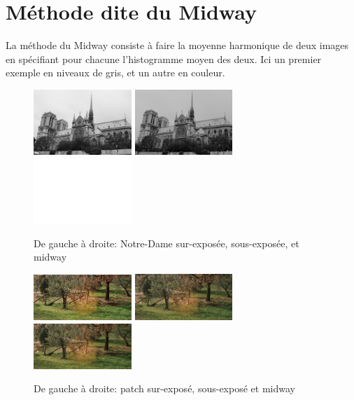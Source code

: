 \documentclass{article}
\begin{document}
\begin{figure}[h]
  \caption{}
\end{figure}


\section{Méthode dite du Midway}
La méthode du Midway consiste à faire la moyenne harmonique de deux images en spécifiant pour chacune l'histogramme moyen des deux. Ici un premier exemple en niveaux de gris, et un autre en couleur.

\begin{figure}[h]
	\includegraphics[width=0.33\textwidth]{NotreDame1.png}
	\includegraphics[width=0.33\textwidth]{NotreDame2.png}
	\includegraphics[width=0.33\textwidth]{NotreDame1M.png}
  \caption{De gauche à droite: Notre-Dame sur-exposée, sous-exposée, et midway}
\end{figure}

\begin{figure}[h]
	\includegraphics[width=0.33\textwidth]{P1c.jpg}
	\includegraphics[width=0.33\textwidth]{P2c.jpg}
	\includegraphics[width=0.33\textwidth]{P1Mc.png}
  \caption{De gauche à droite: patch sur-exposé, sous-exposé et midway}
\end{figure}
\end{document}
